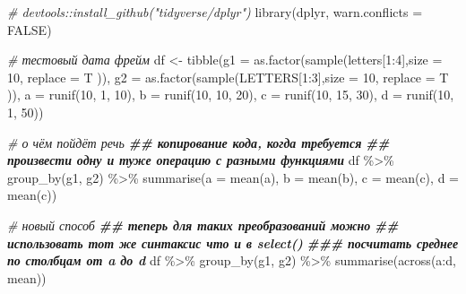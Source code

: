 \documentclass[
]{book}
\newenvironment{Shaded}{\begin{snugshade}}{\end{snugshade}}
\newcommand{\AttributeTok}[1]{\textcolor[rgb]{0.77,0.63,0.00}{#1}}
\newcommand{\CommentTok}[1]{\textcolor[rgb]{0.56,0.35,0.01}{\textit{#1}}}
\newcommand{\ConstantTok}[1]{\textcolor[rgb]{0.00,0.00,0.00}{#1}}
\newcommand{\DecValTok}[1]{\textcolor[rgb]{0.00,0.00,0.81}{#1}}
\newcommand{\DocumentationTok}[1]{\textcolor[rgb]{0.56,0.35,0.01}{\textbf{\textit{#1}}}}
\newcommand{\FunctionTok}[1]{\textcolor[rgb]{0.00,0.00,0.00}{#1}}
\newcommand{\NormalTok}[1]{#1}
\newcommand{\OtherTok}[1]{\textcolor[rgb]{0.56,0.35,0.01}{#1}}
\newcommand{\SpecialCharTok}[1]{\textcolor[rgb]{0.00,0.00,0.00}{#1}}
\begin{document}
\begin{Shaded}
\begin{Highlighting}[]
\CommentTok{\# devtools::install\_github("tidyverse/dplyr")}
\FunctionTok{library}\NormalTok{(dplyr, }\AttributeTok{warn.conflicts =} \ConstantTok{FALSE}\NormalTok{)}

\CommentTok{\# тестовый дата фрейм}
\NormalTok{df }\OtherTok{\textless{}{-}} \FunctionTok{tibble}\NormalTok{(}\AttributeTok{g1 =} \FunctionTok{as.factor}\NormalTok{(}\FunctionTok{sample}\NormalTok{(letters[}\DecValTok{1}\SpecialCharTok{:}\DecValTok{4}\NormalTok{],}\AttributeTok{size =} \DecValTok{10}\NormalTok{, }\AttributeTok{replace =}\NormalTok{ T )),}
             \AttributeTok{g2 =} \FunctionTok{as.factor}\NormalTok{(}\FunctionTok{sample}\NormalTok{(LETTERS[}\DecValTok{1}\SpecialCharTok{:}\DecValTok{3}\NormalTok{],}\AttributeTok{size =} \DecValTok{10}\NormalTok{, }\AttributeTok{replace =}\NormalTok{ T )),}
             \AttributeTok{a  =} \FunctionTok{runif}\NormalTok{(}\DecValTok{10}\NormalTok{, }\DecValTok{1}\NormalTok{, }\DecValTok{10}\NormalTok{),}
             \AttributeTok{b  =} \FunctionTok{runif}\NormalTok{(}\DecValTok{10}\NormalTok{, }\DecValTok{10}\NormalTok{, }\DecValTok{20}\NormalTok{),}
             \AttributeTok{c  =} \FunctionTok{runif}\NormalTok{(}\DecValTok{10}\NormalTok{, }\DecValTok{15}\NormalTok{, }\DecValTok{30}\NormalTok{),}
             \AttributeTok{d  =} \FunctionTok{runif}\NormalTok{(}\DecValTok{10}\NormalTok{, }\DecValTok{1}\NormalTok{, }\DecValTok{50}\NormalTok{))}

\CommentTok{\# о чём пойдёт речь}
\DocumentationTok{\#\# копирование кода, когда требуется }
\DocumentationTok{\#\# произвести одну и туже операцию с разными функциями}
\NormalTok{df }\SpecialCharTok{\%\textgreater{}\%} 
  \FunctionTok{group\_by}\NormalTok{(g1, g2) }\SpecialCharTok{\%\textgreater{}\%} 
  \FunctionTok{summarise}\NormalTok{(}\AttributeTok{a =} \FunctionTok{mean}\NormalTok{(a), }\AttributeTok{b =} \FunctionTok{mean}\NormalTok{(b), }\AttributeTok{c =} \FunctionTok{mean}\NormalTok{(c), }\AttributeTok{d =} \FunctionTok{mean}\NormalTok{(c))}

\CommentTok{\# новый способ}
\DocumentationTok{\#\# теперь для таких преобразований можно}
\DocumentationTok{\#\# использовать тот же синтаксис что и в select()}
\DocumentationTok{\#\#\# посчитать среднее по столбцам от a до d}
\NormalTok{df }\SpecialCharTok{\%\textgreater{}\%} 
  \FunctionTok{group\_by}\NormalTok{(g1, g2) }\SpecialCharTok{\%\textgreater{}\%} 
  \FunctionTok{summarise}\NormalTok{(}\FunctionTok{across}\NormalTok{(a}\SpecialCharTok{:}\NormalTok{d, mean))}


\end{Highlighting}
\end{Shaded}
\end{document}
